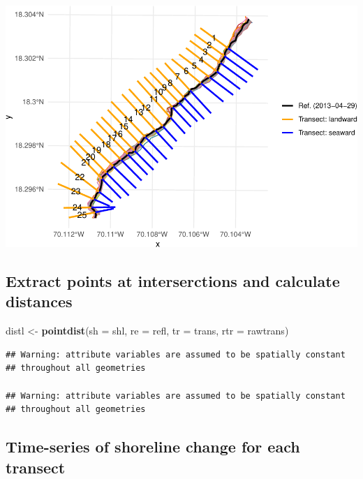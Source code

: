 \documentclass[11pt,]{article}
\newenvironment{Shaded}{\begin{snugshade}}{\end{snugshade}}
\newcommand{\KeywordTok}[1]{\textcolor[rgb]{0.13,0.29,0.53}{\textbf{#1}}}
\newcommand{\DataTypeTok}[1]{\textcolor[rgb]{0.13,0.29,0.53}{#1}}
\newcommand{\StringTok}[1]{\textcolor[rgb]{0.31,0.60,0.02}{#1}}
\newcommand{\NormalTok}[1]{#1}
\begin{document}
\includegraphics{manuscrito_files/figure-latex/unnamed-chunk-3-1.pdf}

\subsection{Extract points at interserctions and calculate
distances}\label{extract-points-at-interserctions-and-calculate-distances}

\begin{Shaded}
\begin{Highlighting}[]
\NormalTok{distl <-}\StringTok{ }\KeywordTok{pointdist}\NormalTok{(}\DataTypeTok{sh =}\NormalTok{ shl, }\DataTypeTok{re =}\NormalTok{ refl, }\DataTypeTok{tr =}\NormalTok{ trans, }\DataTypeTok{rtr =}\NormalTok{ rawtrans)}
\end{Highlighting}
\end{Shaded}

\begin{verbatim}
## Warning: attribute variables are assumed to be spatially constant
## throughout all geometries

## Warning: attribute variables are assumed to be spatially constant
## throughout all geometries
\end{verbatim}

\subsection{Time-series of shoreline change for each
transect}\label{time-series-of-shoreline-change-for-each-transect}
\end{document}
